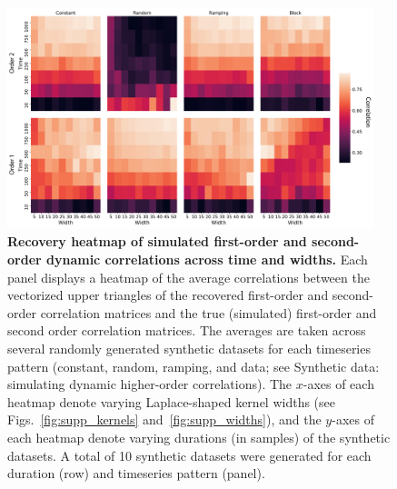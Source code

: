 \documentclass[english]{article}
\begin{document}
\begin{figure}[p!]
\centering
\includegraphics[width=0.95\textwidth]{figs/sim_heatmaps_time}
  \caption{\textbf{Recovery heatmap of simulated first-order and
      second-order dynamic correlations across time and widths.}  Each panel displays a
    heatmap of the average correlations
    between the vectorized upper triangles of the recovered
    first-order and second-order correlation matrices and the true
    (simulated) first-order and second order correlation matrices.
    The averages are taken across several randomly generated
    synthetic datasets for each timeseries pattern (constant, random,
    ramping, and data; see Synthetic data: simulating dynamic higher-order
      correlations).  The $x$-axes of each heatmap denote varying
    Laplace-shaped kernel widths (see Figs.~\ref{fig:supp_kernels}
    and~\ref{fig:supp_widths}), and the $y$-axes of each heatmap
    denote varying durations (in samples) of the synthetic datasets.
    A total of 10 synthetic datasets were generated for each duration
    (row) and timeseries pattern (panel).}
\label{fig:time}
\end{figure}
\end{document}
